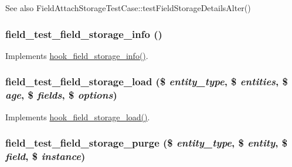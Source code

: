 \begin{DoxySeeAlso}{See also}
FieldAttachStorageTestCase::testFieldStorageDetailsAlter() 
\end{DoxySeeAlso}
\hypertarget{field__test_8storage_8inc_a8467eb75b6a3cacbcd4a29fa23940e88}{
\subsubsection[{field\_\-test\_\-field\_\-storage\_\-info}]{\setlength{\rightskip}{0pt plus 5cm}field\_\-test\_\-field\_\-storage\_\-info ()}}
\label{field__test_8storage_8inc_a8467eb75b6a3cacbcd4a29fa23940e88}
Implements \hyperlink{group__field__storage_gadc5bfde3133504e946bb0aae8babe6f3}{hook\_\-field\_\-storage\_\-info()}. \hypertarget{field__test_8storage_8inc_a10f9c00a27624829625018699df8debf}{
\subsubsection[{field\_\-test\_\-field\_\-storage\_\-load}]{\setlength{\rightskip}{0pt plus 5cm}field\_\-test\_\-field\_\-storage\_\-load (\$ {\em entity\_\-type}, \/  \$ {\em entities}, \/  \$ {\em age}, \/  \$ {\em fields}, \/  \$ {\em options})}}
\label{field__test_8storage_8inc_a10f9c00a27624829625018699df8debf}
Implements \hyperlink{group__field__storage_gac9885dcd8f5d74b5f3137d7af40cf958}{hook\_\-field\_\-storage\_\-load()}. \hypertarget{field__test_8storage_8inc_a5faac556f945fdb5366f0a6034aa5360}{
\subsubsection[{field\_\-test\_\-field\_\-storage\_\-purge}]{\setlength{\rightskip}{0pt plus 5cm}field\_\-test\_\-field\_\-storage\_\-purge (\$ {\em entity\_\-type}, \/  \$ {\em entity}, \/  \$ {\em field}, \/  \$ {\em instance})}}
